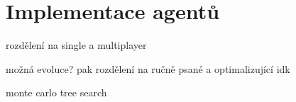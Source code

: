 \chapter{Implementace agentů}

rozdělení na single a multiplayer

možná evoluce? pak rozdělení na ručně psané a optimalizující idk

monte carlo tree search
